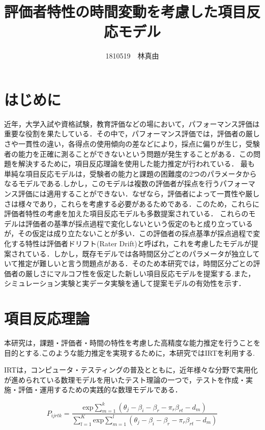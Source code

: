 \documentclass[twocolumn, a4paper]{hcresume}
\title{\bf 評価者特性の時間変動を考慮した項目反応モデル}
\author{1810519　林真由}
\begin{document}
\maketitle
\pagestyle{empty}
\thispagestyle{empty}
\section{はじめに}
近年，大学入試や資格試験，教育評価などの場において，パフォーマンス評価は重要な役割を果たしている．その中で，パフォーマンス評価では，評価者の厳しさや一貫性の違い，各得点の使用傾向の差などにより，採点に偏りが生じ，受験者の能力を正確に測ることができないという問題が発生することがある．この問題を解決するために，項目反応理論を使用した能力推定が行われている．
最も単純な項目反応モデルは，受験者の能力と課題の困難度の2つのパラメータからなるモデルである.しかし，このモデルは複数の評価者が採点を行うパフォーマンス評価には適用することができない．なぜなら，評価者によって一貫性や厳しさは様々であり，これらを考慮する必要があるためである．このため，これらに評価者特性の考慮を加えた項目反応モデルも多数提案されている．
これらのモデルは評価者の基準が採点過程で変化しないという仮定のもと成り立っているが，その仮定は成り立たないことが多い．この評価者の採点基準が採点過程で変化する特性は評価者ドリフト(Rater Drift)と呼ばれ，これを考慮したモデルが提案されている．しかし，既存モデルでは各時間区分ごとのパラメータが独立していて推定が難しいと言う問題点がある．そのため本研究では，時間区分ごとの評価者の厳しさにマルコフ性を仮定した新しい項目反応モデルを提案する.また，シミュレーション実験と実データ実験を通して提案モデルの有効性を示す．

\section{項目反応理論}
本研究は，課題・評価者・時間の特性を考慮した高精度な能力推定を行うことを目的とする.このような能力推定を実現するために，本研究ではIRTを利用する.

IRTは，コンピュータ・テスティングの普及とともに，近年様々な分野で実用化が進められている数理モデルを用いたテスト理論の一つで，テストを作成・実施・評価・運用するための実践的な数理モデルである．

\begin{displaymath}
    P_{ijrtk}=\frac{\mathrm{exp}\sum_{m=1}^{k}(\theta_{j}-\beta_{i}-\beta_{r} - \pi_{r}\beta_{rt}-d_{m})}{\sum_{l=1}^{K}\mathrm{exp}\sum_{m=1}^{l}(\theta_{j}-\beta_{i}-\beta_{r} - \pi_{r}\beta_{rt}-d_{m})}
    \end{displaymath}
\end{document}
